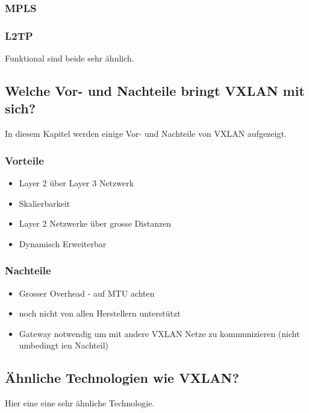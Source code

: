 \documentclass[a4,12pt]{scrartcl}
\begin{document}
\subsubsection{MPLS}

\subsubsection{L2TP}
Funktional sind beide sehr ähnlich. 

\subsection{Welche Vor- und Nachteile bringt VXLAN mit sich?}
In diesem Kapitel werden einige Vor- und Nachteile von VXLAN aufgezeigt. 

\subsubsection{Vorteile}
\begin{itemize}
\item Layer 2 über Layer 3 Netzwerk 
\item Skalierbarkeit 
\item Layer 2 Netzwerke über grosse Distanzen
\item Dynamisch Erweiterbar 
\end{itemize}

\subsubsection{Nachteile}
\begin{itemize}
\item Grosser Overhead - auf MTU achten 
\item noch nicht von allen Herstellern unterstützt
\item Gateway notwendig um mit andere VXLAN Netze zu kommunizieren (nicht umbedingt ien Nachteil) 
\end{itemize}

\subsection{Ähnliche Technologien wie VXLAN?}
Hier eine eine sehr ähnliche Technologie. 
\end{document}

